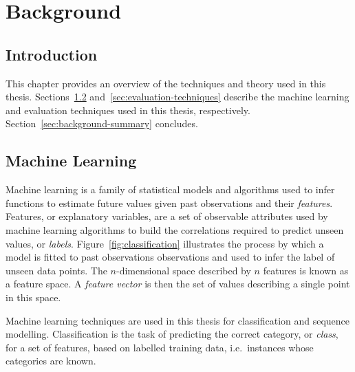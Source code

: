\chapter{Background}
\label{chap:background}

\section{Introduction}

This chapter provides an overview of the techniques and theory used in this thesis. Sections~\ref{sec:background-machine-learning} and~\ref{sec:evaluation-techniques} describe the machine learning and evaluation techniques used in this thesis, respectively.  Section~\ref{sec:background-summary} concludes.


\section{Machine Learning}
\label{sec:background-machine-learning}

Machine learning is a family of statistical models and algorithms used to infer functions to estimate future values given past observations and their \emph{features}. Features, or explanatory variables, are a set of observable attributes used by machine learning algorithms to build the correlations required to predict unseen values, or \emph{labels}. Figure~\ref{fig:classification} illustrates the process by which a model is fitted to past observations observations and used to infer the label of unseen data points. The $n$-dimensional space described by $n$ features is known as a feature space. A \emph{feature vector} is then the set of values describing a single point in this space.

Machine learning techniques are used in this thesis for classification and sequence modelling. Classification is the task of predicting the correct category, or \emph{class}, for a set of features, based on labelled training data, i.e.\ instances whose categories are known.

